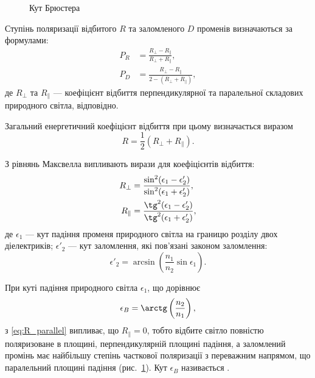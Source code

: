 \begin{figure}[h!]\centering

\caption{Кут Брюстера}
\label{pic:brewster}
\end{figure}


Ступінь поляризації відбитого $ R $ та заломленого $ D $ променів
визначаються за формулами:
\begin{align}
    P_R &= \frac{R_\perp - R_\parallel}{R_\perp + R_\parallel}, \\
    P_D &= \frac{R_\perp - R_\parallel}{2 - (R_\perp + R_\parallel)} \label{eq:P_D},
\end{align}
де $R_\perp$ та  $ R_\parallel $ --- коефіцієнт відбиття перпендикулярної та паралельної складових природного світла, відповідно.

Загальний енергетичний коефіцієнт відбиття при цьому визначається
виразом
\begin{equation*}
    R = \frac12 (R_\perp + R_\parallel).
\end{equation*}

З рівнянь Максвелла випливають вирази для коефіцієнтів відбиття:
\begin{align}
    R_\perp &= \frac{\sin^2(\epsilon_1 - \epsilon'_2)}{\sin^2(\epsilon_1 + \epsilon'_2)}, \label{eq:R_perp}\\
    R_\parallel &= \frac{\tg^2(\epsilon_1 - \epsilon'_2)}{\tg^2(\epsilon_1 + \epsilon'_2)}, \label{eq:R_parallel}
\end{align}
де $ \epsilon_1 $ --- кут падіння променя природного світла на границю розділу двох діелектриків; $ \epsilon'_2 $ --- кут заломлення, які пов'язані законом заломлення:
\begin{equation*}
    \epsilon'_2 = \arcsin\left( \frac{n_1}{n_2} \sin\epsilon_1\right).
\end{equation*}

При куті падіння природного світла $ \epsilon_1  $, що дорівнює
\begin{equation}\label{eq:Brewster}
     \epsilon_B = \arctg\left(  \frac{n_2}{n_1} \right),
\end{equation}
з \eqref{eq:R_parallel} випливає, що $R_\parallel = 0$,  тобто
відбите світло повністю поляризоване в площині,
перпендикулярній площині падіння, а заломлений промінь має найбільшу
степінь часткової поляризації з переважним напрямом, що паралельний
площині падіння (рис.~\ref{pic:brewster}). Кут $ \epsilon_B $ називається .

